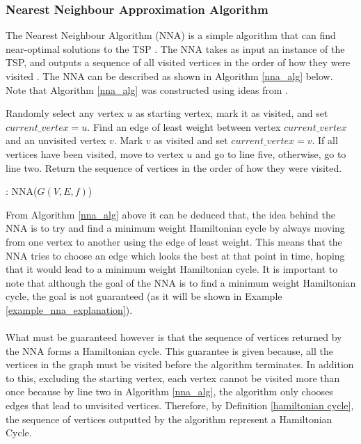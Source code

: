 \documentclass[12pt]{article}
\numberwithin{equation}{subsection}
\numberwithin{table}{subsection}
\numberwithin{algorithm}{subsection}
\numberwithin{figure}{subsection}
\begin{document}
\subsubsection{Nearest Neighbour Approximation Algorithm}
\label{nna_section}
The Nearest Neighbour Algorithm (NNA) is a simple algorithm that can find near-optimal solutions to the TSP \cite{arora_agarwal_tanwar_2016}. The NNA takes as input an instance of the TSP, and outputs a sequence of all visited vertices in the order of how they were visited \cite{arora_agarwal_tanwar_2016}. The NNA can be described as shown in Algorithm \ref{nna_alg} below. Note that Algorithm \ref{nna_alg} was constructed using ideas from \cite{arora_agarwal_tanwar_2016}.
\begin{algorithm}[H]
\begin{algorithmic}[1]
\State Randomly select any vertex $u$ as starting vertex, mark it as visited, and set $current\_vertex = u$.
\State Find an edge of least weight between vertex $current\_vertex$ and an unvisited vertex $v$.
\State Mark $v$ as visited and set $current\_vertex = v$.
\State If all vertices have been visited, move to vertex $u$ and go to line five, otherwise, go to line two.
\State Return the sequence of vertices in the order of how they were visited.
\caption{: NNA($G(V,E,f)$)}
\label{nna_alg}
\end{algorithmic}
\end{algorithm}
From Algorithm \ref{nna_alg} above it can be deduced that, the idea behind the NNA is to try and find a minimum weight Hamiltonian cycle by always moving from one vertex to another using the edge of least weight. This means that the NNA tries to choose an edge which looks the best at that point in time, hoping that it would lead to a minimum weight Hamiltonian cycle. It is important to note that although the goal of the NNA is to find a minimum weight Hamiltonian cycle, the goal is not guaranteed (as it will be shown in Example \ref{example_nna_explanation}).
\\\\What must be guaranteed however is that the sequence of vertices returned by the NNA forms a Hamiltonian cycle. This guarantee is given because, all the vertices in the graph must be visited before the algorithm terminates. In addition to this, excluding the starting vertex, each vertex cannot be visited more than once because by line two in Algorithm \ref{nna_alg}, the algorithm only chooses edges that lead to unvisited vertices. Therefore, by Definition \ref{hamiltonian cycle}, the sequence of vertices outputted by the algorithm represent a Hamiltonian Cycle.
\end{document}
